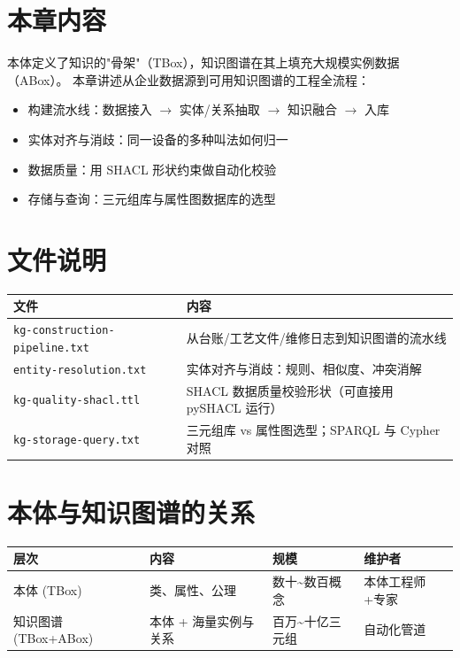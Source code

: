 
\section{本章内容}

本体定义了知识的"骨架"（TBox），知识图谱在其上填充大规模实例数据（ABox）。
本章讲述从企业数据源到可用知识图谱的工程全流程：
\begin{itemize}
\item 构建流水线：数据接入 \(\rightarrow\) 实体/关系抽取 \(\rightarrow\) 知识融合 \(\rightarrow\) 入库
\item 实体对齐与消歧：同一设备的多种叫法如何归一
\item 数据质量：用 SHACL 形状约束做自动化校验
\item 存储与查询：三元组库与属性图数据库的选型
\end{itemize}

\section{文件说明}

\begin{center}
\begin{tabularx}{\linewidth}{@{}XX@{}}
\toprule
\textbf{文件} & \textbf{内容} \\
\midrule
\texttt{kg-construction-pipeline.txt} & 从台账/工艺文件/维修日志到知识图谱的流水线 \\
\texttt{entity-resolution.txt} & 实体对齐与消歧：规则、相似度、冲突消解 \\
\texttt{kg-quality-shacl.ttl} & SHACL 数据质量校验形状（可直接用 pySHACL 运行） \\
\texttt{kg-storage-query.txt} & 三元组库 vs 属性图选型；SPARQL 与 Cypher 对照 \\
\bottomrule
\end{tabularx}
\end{center}

\section{本体与知识图谱的关系}

\begin{center}
\begin{tabularx}{\linewidth}{@{}XXll@{}}
\toprule
\textbf{层次} & \textbf{内容} & \textbf{规模} & \textbf{维护者} \\
\midrule
本体 (TBox) & 类、属性、公理 & 数十\textasciitilde{}数百概念 & 本体工程师+专家 \\
知识图谱 (TBox+ABox) & 本体 + 海量实例与关系 & 百万\textasciitilde{}十亿三元组 & 自动化管道 \\
\bottomrule
\end{tabularx}
\end{center}

